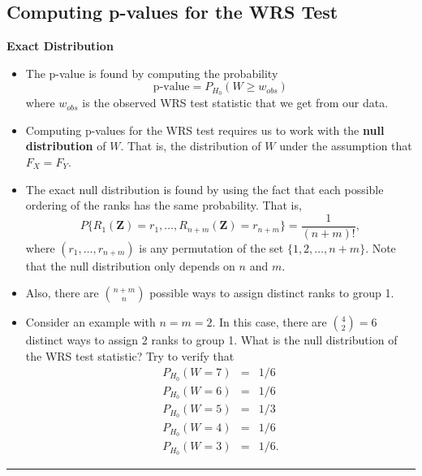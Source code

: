 \documentclass[]{book}
\begin{document}
\hypertarget{computing-p-values-for-the-wrs-test}{%
\subsection{Computing p-values for the WRS Test}\label{computing-p-values-for-the-wrs-test}}

\textbf{Exact Distribution}

\begin{itemize}
\item
  The p-value is found by computing the probability
  \begin{equation}
  \textrm{p-value} = P_{H_{0}}( W \geq w_{obs})
  \end{equation}
  where \(w_{obs}\) is the observed WRS test statistic that
  we get from our data.
\item
  Computing p-values for the WRS test requires us to
  work with the \textbf{null distribution} of \(W\). That is,
  the distribution of \(W\) under the assumption that
  \(F_{X} = F_{Y}\).
\item
  The exact null distribution is found by using the fact
  that each possible ordering of the ranks has the same probability.
  That is,
  \begin{equation}
  P\{ R_{1}(\mathbf{Z}) = r_{1}, \ldots, R_{n+m}(\mathbf{Z}) =  r_{n+m} \} = \frac{1}{(n + m)!},
  \end{equation}
  where \((r_{1}, \ldots, r_{n+m})\) is any permutation of the set \(\{1, 2, \ldots, n + m\}\).
  Note that the null distribution only depends on \(n\) and \(m\).
\item
  Also, there are \({n + m \choose n}\) possible ways to assign distinct ranks to group 1.
\item
  Consider an example with \(n = m = 2\). In this case, there are \({4 \choose 2} = 6\) distinct
  ways to assign 2 ranks to group 1.
  What is the null distribution of the WRS test statistic? Try to verify that
  \begin{eqnarray}
  P_{H_{0}}( W = 7) &=& 1/6 \nonumber \\
  P_{H_{0}}( W = 6 ) &=& 1/6 \nonumber \\
  P_{H_{0}}(W = 5) &=& 1/3  \nonumber \\
  P_{H_{0}}( W = 4 ) &=& 1/6  \nonumber \\
  P_{H_{0}}(W = 3) &=& 1/6. \nonumber 
  \end{eqnarray}
\end{itemize}

\begin{center}\rule{0.5\linewidth}{\linethickness}\end{center}
\end{document}
